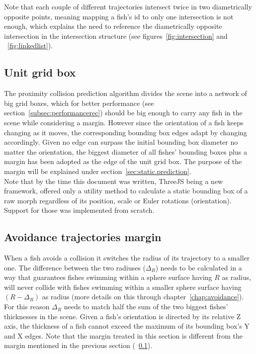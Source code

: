 Note that each couple of different trajectories intersect twice in two diametrically opposite points, meaning mapping a fish's id to only one intersection is not enough, which explains the need to reference the diametrically opposite intersection in the intersection structure (see figures~\ref{fig:intersection} and ~\ref{fig:linkedlist}).

\subsection{Unit grid box}
\label{subsec:ugb}

The proximity collision prediction algorithm divides the scene into a network of big grid boxes, which for better performance (see section~\ref{subsec:performancerec}) should be big enough to carry any fish in the scene while considering a margin. However since the orientation of a fish keeps changing as it moves, the corresponding bounding box edges adapt by changing accordingly. Given no edge can surpass the initial bounding box diameter no matter the orientation, the biggest diameter of all fishes' bounding boxes plus a margin has been adopted as the edge of the unit grid box. The purpose of the margin will be explained under section~\ref{sec:static.prediction}.\\

Note that by the time this document was written, ThreeJS being a new framework, offered only a utility method to calculate a static bounding box of a raw morph regardless of its position, scale or Euler rotations (orientation). Support for those was implemented from scratch.

\subsection{Avoidance trajectories margin}
\label{subsec:avoidance-margin}

When a fish avoids a collision it switches the radius of its trajectory to a smaller one. The difference between the two radiuses ($\Delta_{R}$) needs to be calculated in a way that guarantees fishes swimming within a sphere surface having $R$ as radius, will never collide with fishes swimming within a smaller sphere surface having $(R-\Delta_{R})$ as radius (more details on this through chapter~\ref{chap:avoidance}). For this reason $\Delta_{R}$ needs to match half the sum of the two biggest fishes' thicknesses in the scene. Given a fish's orientation is directed by its relative Z axis, the thickness of a fish cannot exceed the maximum of its bounding box's Y and X edges. Note that the margin treated in this section is different from the margin mentioned in the previous section (~\ref{subsec:ugb}).

